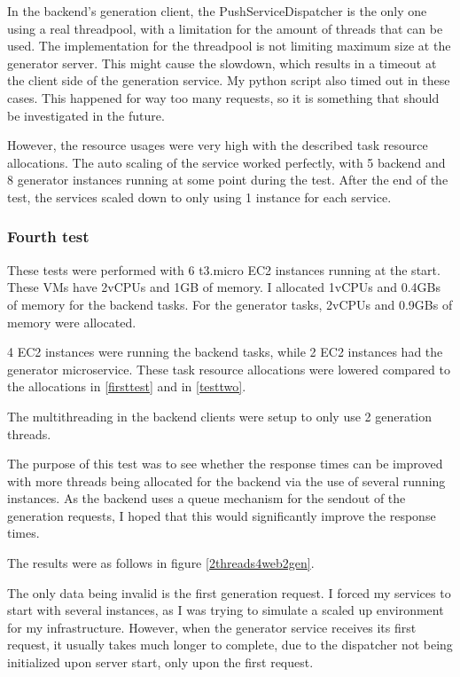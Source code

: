 			In the backend's generation client, the PushServiceDispatcher is the only one using a real threadpool, with a 
			limitation for the amount of threads that can be used. 
			The implementation for the threadpool is not limiting
			maximum size at the generator server. This might cause the slowdown, which results in a timeout at the client side of the generation service.
			My python script also timed out in these cases. This happened for way too many 
			requests, so it is something that should be investigated in the future.

			However, the resource usages were very high with the described task resource allocations. The auto scaling of the service worked perfectly,
			with 5 backend and 8 generator instances running at some point during the test. After the end of the test, the services scaled down 
			to only using 1 instance for each service.

		\subsubsection{Fourth test}
			These tests were performed with 6 t3.micro EC2 instances running at the start. 
			These VMs have 2vCPUs and 1GB of memory. I allocated
			1vCPUs and 0.4GBs of memory for the backend tasks. 
			For the generator tasks, 2vCPUs and 0.9GBs of memory were allocated.

			4 EC2 instances were running the backend tasks, while 2 EC2 instances had the generator microservice.
			These task resource allocations were lowered compared to the allocations in \ref{firsttest} and in \ref{testtwo}.

			The multithreading in the backend clients were setup to only use 2 generation threads.

			The purpose of this test was to see whether the response times can be improved with more threads being allocated for the backend via 
			the use of several running instances.
			As the backend uses a queue mechanism for the sendout of the generation requests, I hoped that this would significantly improve the 
			response times.

			The results were as follows in figure \ref{2threads4web2gen}.

			The only data being invalid is the first generation request. I forced my services to start with several instances, as I was trying to 
			simulate a scaled up environment for my infrastructure. However, when the generator service receives its first request, it usually takes
			much longer to complete, due to the dispatcher not being initialized upon server start, only upon the first request.

